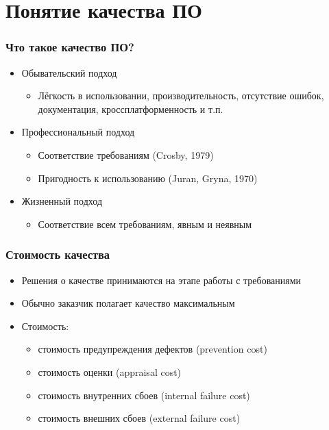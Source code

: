 \documentclass{../../slides-style}
\begin{document}
    \begin{frame}[plain]
        \titlepage
    \end{frame}

    \section{Понятие качества ПО}

    \begin{frame}
        \frametitle{Что такое качество ПО?}
        \begin{itemize}
            \item Обывательский подход
            \begin{itemize}
                \item Лёгкость в использовании, производительность, отсутствие ошибок, документация, кроссплатформенность и т.п.
            \end{itemize}
            \item Профессиональный подход
            \begin{itemize}
                \item Соответствие требованиям (Crosby, 1979)
                \item Пригодность к использованию (Juran, Gryna, 1970)
            \end{itemize}
            \item Жизненный подход
            \begin{itemize}
                \item Соответствие всем требованиям, явным и неявным
            \end{itemize}
        \end{itemize}
    \end{frame}

    \begin{frame}
        \frametitle{Стоимость качества}
        \begin{itemize}
            \item Решения о качестве принимаются на этапе работы с требованиями
            \item Обычно заказчик полагает качество максимальным
            \item Стоимость:
            \begin{itemize}
                \item стоимость предупреждения дефектов (prevention cost)
                \item стоимость оценки (appraisal cost)
                \item стоимость внутренних сбоев (internal failure cost)
                \item стоимость внешних сбоев (external failure cost)
            \end{itemize}
        \end{itemize}
    \end{frame}
\end{document}
